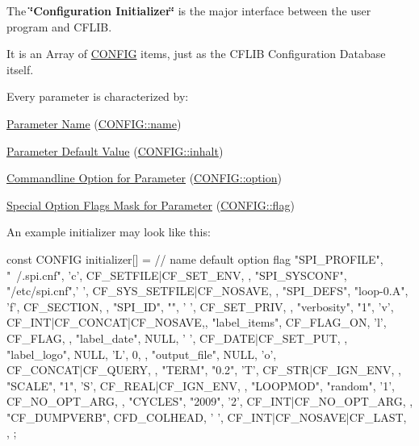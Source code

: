 The {\bfseries \char`\"{}\-Configuration Initializer\char`\"{}} is the major interface between the user program and C\-F\-L\-I\-B.

It is an Array of \hyperlink{struct_c_o_n_f_i_g}{C\-O\-N\-F\-I\-G} items, just as the C\-F\-L\-I\-B Configuration Database itself.

Every parameter is characterized by\-:


\begin{DoxyItemize}
\item \hyperlink{config_initializer_parameter_name}{Parameter Name} (\hyperlink{struct_c_o_n_f_i_g_a196d63e311e3d1aa79fe4f16f20ce2a5}{C\-O\-N\-F\-I\-G\-::name})
\end{DoxyItemize}


\begin{DoxyItemize}
\item \hyperlink{config_initializer_parameter_default}{Parameter Default Value} (\hyperlink{struct_c_o_n_f_i_g_ab8cae13203b07fabaa40e407fa8dbdfb}{C\-O\-N\-F\-I\-G\-::inhalt})
\end{DoxyItemize}


\begin{DoxyItemize}
\item \hyperlink{config_initializer_parameter_option}{Commandline Option for Parameter} (\hyperlink{struct_c_o_n_f_i_g_a60563bd93e85c1ddb8291a2d27a9c472}{C\-O\-N\-F\-I\-G\-::option})
\end{DoxyItemize}


\begin{DoxyItemize}
\item \hyperlink{config_initializer_parameter_flagmask}{Special Option Flags Mask for Parameter} (\hyperlink{struct_c_o_n_f_i_g_ab04d08abdf758c0400caaded716f4089}{C\-O\-N\-F\-I\-G\-::flag})
\end{DoxyItemize}

An example initializer may look like this\-: 
\begin{DoxyCode}
 const CONFIG initializer[] = {
       // name        default        option  flag
     { "SPI_PROFILE", "~/.spi.cnf",  'c',    CF_SETFILE|CF_SET_ENV,     },
     { "SPI_SYSCONF", "/etc/spi.cnf",' ',    CF_SYS_SETFILE|CF_NOSAVE,  },
     { "SPI_DEFS",    "loop-0.A",    'f',    CF_SECTION,                },
     { "SPI_ID",      "",            ' ',    CF_SET_PRIV,               },
     { "verbosity",   "1",           'v',    CF_INT|CF_CONCAT|CF_NOSAVE,},
     { "label_items", CF_FLAG_ON,    'l',    CF_FLAG,                   },
     { "label_date",  NULL,          ' ',    CF_DATE|CF_SET_PUT,        },
     { "label_logo",  NULL,          'L',    0,                         },
     { "output_file", NULL,          'o',    CF_CONCAT|CF_QUERY,        },
     { "TERM",        "0.2",         'T',    CF_STR|CF_IGN_ENV,         },
     { "SCALE",       "1",           'S',    CF_REAL|CF_IGN_ENV,        },
     { "LOOPMOD",     "random",      '1',    CF_NO_OPT_ARG,             },
     { "CYCLES",      "2009",        '2',    CF_INT|CF_NO_OPT_ARG,      },
     { "CF_DUMPVERB", CFD_COLHEAD,   ' ',    CF_INT|CF_NOSAVE|CF_LAST,  },
 };
\end{DoxyCode}



